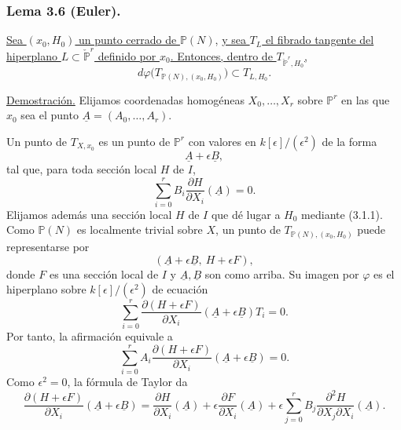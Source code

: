 \subsubsection*{Lema 3.6 (Euler).}
\underline{Sea $(x_0,H_0)$ un punto cerrado de $\mathbb P(N)$}, \underline{y sea
$T_L$ el fibrado tangente del hiperplano
$L\subset\check{\mathbb P}^{r}$ definido por $x_0$. Entonces, dentro
de $T_{\check{\mathbb P}^{r},H_0}$,}
\[
d\varphi\bigl(T_{\mathbb P(N),(x_0,H_0)}\bigr)
\subset T_{L,H_0}.
\]

\noindent\underline{Demostración.}
Elijamos coordenadas homogéneas $X_0,\ldots,X_r$ sobre $\mathbb P^r$
en las que $x_0$ sea el punto
$\underline A=(A_0,\ldots,A_r)$.

\pageoriginale

Un punto de $T_{X,x_0}$ es un punto de $\mathbb P^r$ con valores en
$k[\epsilon]/(\epsilon^2)$ de la forma
\begin{equation}\tag{3.6.1}
\underline A+\epsilon\underline B,
\end{equation}
tal que, para toda sección local $H$ de $I$,
\begin{equation}\tag{3.6.2}
\sum_{i=0}^{r}B_i
\frac{\partial H}{\partial X_i}(\underline A)=0.
\end{equation}
Elijamos además una sección local $H$ de $I$ que dé lugar a $H_0$
mediante (3.1.1). Como $\mathbb P(N)$ es localmente trivial sobre
$X$, un punto de $T_{\mathbb P(N),(x_0,H_0)}$ puede representarse por
\begin{equation}\tag{3.6.3}
(\underline A+\epsilon\underline B,\ H+\epsilon F),
\end{equation}
donde $F$ es una sección local de $I$ y $\underline A,\underline B$
son como arriba. Su imagen por $\varphi$ es el hiperplano sobre
$k[\epsilon]/(\epsilon^2)$ de ecuación
\begin{equation}\tag{3.6.4}
\sum_{i=0}^{r}
\frac{\partial(H+\epsilon F)}{\partial X_i}
(\underline A+\epsilon\underline B)T_i=0.
\end{equation}
Por tanto, la afirmación equivale a
\begin{equation}\tag{3.6.5}
\sum_{i=0}^{r}A_i
\frac{\partial(H+\epsilon F)}{\partial X_i}
(\underline A+\epsilon\underline B)=0.
\end{equation}
Como $\epsilon^2=0$, la fórmula de Taylor da
\begin{equation}\tag{3.6.6}
\frac{\partial(H+\epsilon F)}{\partial X_i}
(\underline A+\epsilon\underline B)
=\frac{\partial H}{\partial X_i}(\underline A)
+\epsilon\frac{\partial F}{\partial X_i}(\underline A)
+\epsilon\sum_{j=0}^{r}B_j
\frac{\partial^2H}{\partial X_j\partial X_i}(\underline A).
\end{equation}

